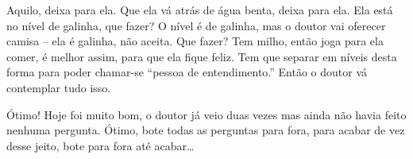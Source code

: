 Aquilo, deixa para ela. Que ela vá atrás de água benta, deixa para
ela. Ela está no nível de galinha, que fazer? O nível é de galinha, mas
o doutor vai oferecer camisa – ela é galinha, não aceita. Que fazer?
Tem milho, então joga para ela comer, é melhor assim, para que ela
fique feliz. Tem que separar em níveis desta forma para poder chamar-se
“pessoa de entendimento.” Então o doutor vá contemplar tudo isso.

Ótimo! Hoje foi muito bom, o doutor já veio duas vezes mas ainda não
havia feito nenhuma pergunta. Ótimo, bote todas as perguntas para fora,
para acabar de vez desse jeito, bote para fora até acabar\ldots{}
